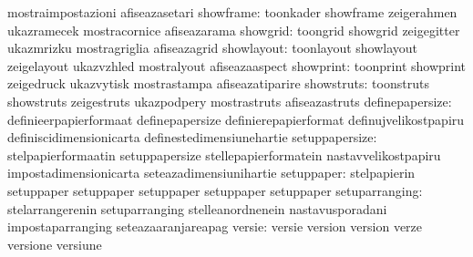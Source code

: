                                   mostraimpostazioni               afiseazasetari
                       showframe: toonkader                        showframe
                                  zeigerahmen                      ukazramecek
                                  mostracornice                    afiseazarama
                        showgrid: toongrid                         showgrid
                                  zeigegitter                      ukazmrizku
                                  mostragriglia                    afiseazagrid
                      showlayout: toonlayout                       showlayout
                                  zeigelayout                      ukazvzhled
                                  mostralyout                      afiseazaaspect
                       showprint: toonprint                        showprint
                                  zeigedruck                       ukazvytisk
                                  mostrastampa                     afiseazatiparire
                      showstruts: toonstruts                       showstruts
                                  zeigestruts                      ukazpodpery
                                  mostrastruts                     afiseazastruts
                 definepapersize: definieerpapierformaat           definepapersize
                                  definierepapierformat            definujvelikostpapiru
                                  definiscidimensionicarta         definestedimensiunehartie
                  setuppapersize: stelpapierformaatin              setuppapersize
                                  stellepapierformatein            nastavvelikostpapiru
                                  impostadimensionicarta           seteazadimensiunihartie
setuppaper: stelpapierin  setuppaper
            setuppaper    setuppaper
            setuppaper    setuppaper
                  setuparranging: stelarrangerenin                 setuparranging
                                  stelleanordnenein                nastavusporadani
                                  impostaparranging                seteazaaranjareapag
                          versie: versie                           version
                                  version                          verze
                                  versione                         versiune
